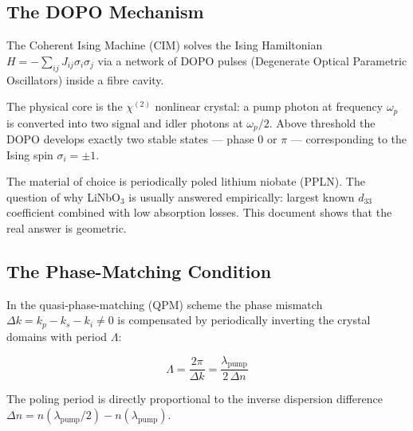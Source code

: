\subsection{The DOPO Mechanism}

The Coherent Ising Machine (CIM) solves the Ising Hamiltonian
$H = -\sum_{ij} J_{ij}\sigma_i\sigma_j$ via a network of DOPO pulses
(Degenerate Optical Parametric Oscillators) inside a fibre cavity.

The physical core is the $\chi^{(2)}$ nonlinear crystal: a pump photon at
frequency $\omega_p$ is converted into two signal and idler photons at
$\omega_p/2$. Above threshold the DOPO develops exactly two stable states
— phase 0 or $\pi$ — corresponding to the Ising spin $\sigma_i = \pm 1$.

The material of choice is periodically poled lithium niobate (PPLN). The
question of why LiNbO$_3$ is usually answered empirically: largest known
$d_{33}$ coefficient combined with low absorption losses. This document
shows that the real answer is geometric.

\subsection{The Phase-Matching Condition}

In the quasi-phase-matching (QPM) scheme the phase mismatch
$\Delta k = k_p - k_s - k_i \neq 0$ is compensated by periodically
inverting the crystal domains with period $\Lambda$:

\begin{equation}
    \Lambda = \frac{2\pi}{\Delta k} = \frac{\lambda_{\text{pump}}}{2\,\Delta n}
    \label{eq:poling}
\end{equation}

The poling period is directly proportional to the inverse dispersion
difference $\Delta n = n(\lambda_{\text{pump}}/2) - n(\lambda_{\text{pump}})$.

\begin{table}[H]
    \centering
    \caption{Typical PPLN parameters for LiNbO$_3$ (extraordinary polarisation,
    room temperature, Sellmeier coefficients after Zelmon 1997).}
    \label{tab:ppln}
\end{table}


